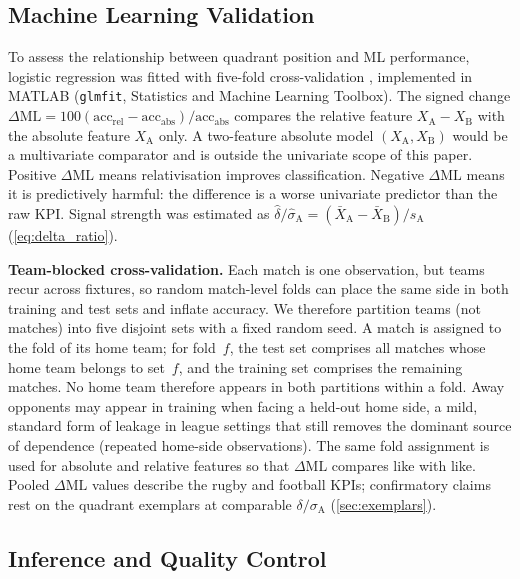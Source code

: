 \subsection{Machine Learning Validation}
\label{sec:ml_cv}

To assess the relationship between quadrant position and ML performance, logistic regression was fitted with five-fold cross-validation \parencite{kohavi1995}, implemented in {MATLAB} (\texttt{glmfit}, Statistics and Machine Learning Toolbox). The signed change $\Delta\mathrm{ML}=100(\mathrm{acc}_{\mathrm{rel}}-\mathrm{acc}_{\mathrm{abs}})/\mathrm{acc}_{\mathrm{abs}}$ compares the relative feature $X_{\mathrm{A}}-X_{\mathrm{B}}$ with the absolute feature $X_{\mathrm{A}}$ only. A two-feature absolute model $(X_{\mathrm{A}},X_{\mathrm{B}})$ would be a multivariate comparator and is outside the univariate scope of this paper. Positive $\Delta\mathrm{ML}$ means relativisation improves classification. Negative $\Delta\mathrm{ML}$ means it is predictively harmful: the difference is a worse univariate predictor than the raw KPI. Signal strength was estimated as $\hat{\delta}/\hat{\sigma}_{\mathrm{A}} = (\bar{X}_{\mathrm{A}}-\bar{X}_{\mathrm{B}})/s_{\mathrm{A}}$ (\cref{eq:delta_ratio}).

\textbf{Team-blocked cross-validation.} Each match is one observation, but teams recur across fixtures, so random match-level folds can place the same side in both training and test sets and inflate accuracy. We therefore partition teams (not matches) into five disjoint sets with a fixed random seed. A match is assigned to the fold of its home team; for fold~$f$, the test set comprises all matches whose home team belongs to set~$f$, and the training set comprises the remaining matches. No home team therefore appears in both partitions within a fold. Away opponents may appear in training when facing a held-out home side, a mild, standard form of leakage in league settings that still removes the dominant source of dependence (repeated home-side observations). The same fold assignment is used for absolute and relative features so that $\Delta\mathrm{ML}$ compares like with like. Pooled $\Delta\mathrm{ML}$ values describe the rugby and football KPIs; confirmatory claims rest on the quadrant exemplars at comparable $\delta/\sigma_{\mathrm{A}}$ (\cref{sec:exemplars}).

\subsection{Inference and Quality Control}
\label{sec:qc}

